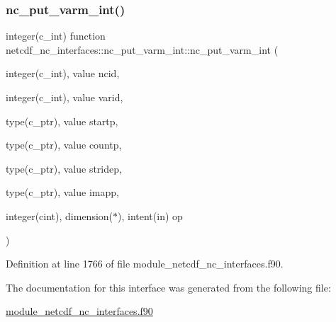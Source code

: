 \subsubsection{\texorpdfstring{nc\+\_\+put\+\_\+varm\+\_\+int()}{nc\_put\_varm\_int()}}
{\footnotesize\ttfamily integer(c\+\_\+int) function netcdf\+\_\+nc\+\_\+interfaces\+::nc\+\_\+put\+\_\+varm\+\_\+int\+::nc\+\_\+put\+\_\+varm\+\_\+int (\begin{DoxyParamCaption}\item[{integer(c\+\_\+int), value}]{ncid,  }\item[{integer(c\+\_\+int), value}]{varid,  }\item[{type(c\+\_\+ptr), value}]{startp,  }\item[{type(c\+\_\+ptr), value}]{countp,  }\item[{type(c\+\_\+ptr), value}]{stridep,  }\item[{type(c\+\_\+ptr), value}]{imapp,  }\item[{integer(cint), dimension($\ast$), intent(in)}]{op }\end{DoxyParamCaption})}



Definition at line 1766 of file module\+\_\+netcdf\+\_\+nc\+\_\+interfaces.\+f90.



The documentation for this interface was generated from the following file\+:\begin{DoxyCompactItemize}
\item 
\hyperlink{module__netcdf__nc__interfaces_8f90}{module\+\_\+netcdf\+\_\+nc\+\_\+interfaces.\+f90}\end{DoxyCompactItemize}
